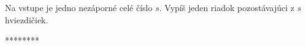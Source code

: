 




Na vstupe je jedno nezáporné celé číslo $s$. Vypíš jeden riadok pozostávajúci z $s$ hviezdičiek.

\vystup
********
\koniec


